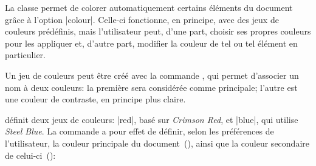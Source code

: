 La classe \frenchlaw permet de colorer automatiquement certains éléments du document grâce à l'option |colour|. Celle-ci fonctionne, en principe, avec des jeux de couleurs prédéfinis, mais l'utilisateur peut, d'une part, choisir ses propres couleurs pour les appliquer et, d'autre part, modifier la couleur de tel ou tel élément en particulier.

\begin{noprint}
\newcommand{\setcolourscheme}[3]{%
	\expandafter\gdef\csname setmaincolour@#1\endcsname{\color[HTML]{#2}}%
	\expandafter\gdef\csname setsubcolour@#1\endcsname{\color[HTML]{#3}}}
\newcommand{\setcolours}[1]{%
	\gdef\maincolour{\csname setmaincolour@#1\endcsname}%
	\gdef\subcolour{\csname setsubcolour@#1\endcsname}}
\end{noprint}

\begin{developer}
Un jeu de couleurs peut être créé avec la commande , qui permet d'associer un nom à deux couleurs: la première sera considérée comme principale; l'autre est une couleur de contraste, en principe plus claire.\par
\begin{macro}
\end{macro}
\end{developer}

\begin{noprint}
\end{noprint}

\frenchlaw définit deux jeux de couleurs: |red|, basé sur \emph{Crimson Red}, et |blue|, qui utilise \emph{Steel Blue}. La commande  a pour effet de définir, selon les préférences de l'utilisateur, la couleur principale du document~(), ainsi que la couleur secondaire de celui-ci~():

